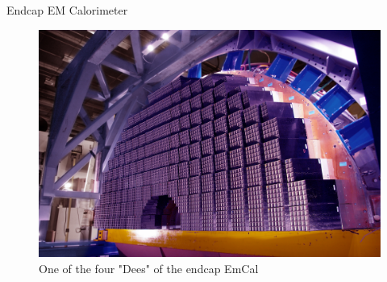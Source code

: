 \documentclass[10pt]{beamer}
\begin{document}
\begin{frame}{Endcap EM Calorimeter}
    \begin{figure}
        \centering
        \includegraphics[width=\textwidth]{./img/ecal_endcap_photo.jpg}
        \caption{One of the four "Dees" of the endcap EmCal }
        \label{fig:ecal_dees}
    \end{figure}
\end{frame}
\end{document}
